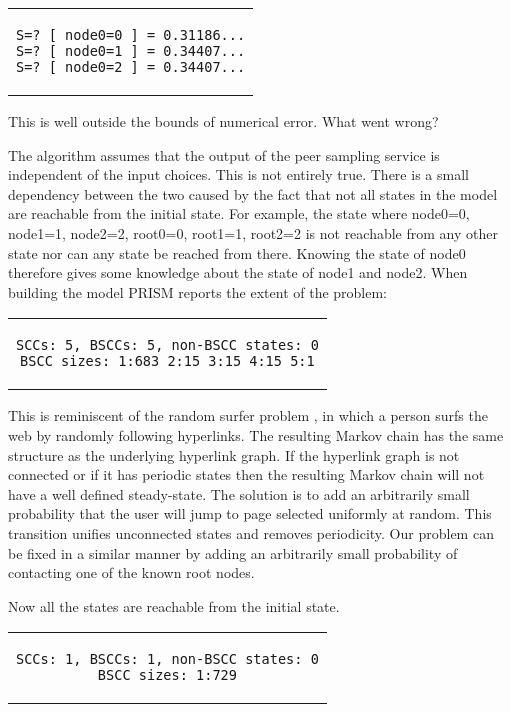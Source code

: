 \documentclass[a4paper,10pt]{article}
\newcommand{\code}[1]{
  \footnotesize
  
}
\newcommand{\prismmodel}[1]{
  \begin{quotation}
  \code{../models/#1.sm}
  \end{quotation}
}
\newenvironment{prismprop}[0]{
  \begin{center}
  \begin{tabular}{c}
  \footnotesize
}{
  \end{tabular}
  \end{center}
}
\begin{document}
\begin{prismprop}
\begin{lstlisting}
S=? [ node0=0 ] = 0.31186...
S=? [ node0=1 ] = 0.34407...
S=? [ node0=2 ] = 0.34407...
\end{lstlisting}
\end{prismprop}

This is well outside the bounds of numerical error. What went wrong? 

The algorithm assumes that the output of the peer sampling service is independent of the input choices. This is not entirely true. There is a small dependency between the two caused by the fact that not all states in the model are reachable from the initial state. For example, the state where node0=0, node1=1, node2=2, root0=0, root1=1, root2=2 is not reachable from any other state nor can any state be reached from there. Knowing the state of node0 therefore gives some knowledge about the state of node1 and node2. When building the model PRISM reports the extent of the problem:

\begin{prismprop}
\begin{lstlisting}
SCCs: 5, BSCCs: 5, non-BSCC states: 0
BSCC sizes: 1:683 2:15 3:15 4:15 5:1
\end{lstlisting}
\end{prismprop}

This is reminiscent of the random surfer problem \cite{random_surfer}, in which a person surfs the web by randomly following hyperlinks. The resulting Markov chain has the same structure as the underlying hyperlink graph. If the hyperlink graph is not connected or if it has periodic states then the resulting Markov chain will not have a well defined steady-state. The solution is to add an arbitrarily small probability that the user will jump to page selected uniformly at random. This transition unifies unconnected states and removes periodicity. Our problem can be fixed in a similar manner by adding an arbitrarily small probability of contacting one of the known root nodes.

\prismmodel{ctmc_full}

Now all the states are reachable from the initial state.

\begin{prismprop}
\begin{lstlisting}
SCCs: 1, BSCCs: 1, non-BSCC states: 0
BSCC sizes: 1:729
\end{lstlisting}
\end{prismprop}
\end{document}
